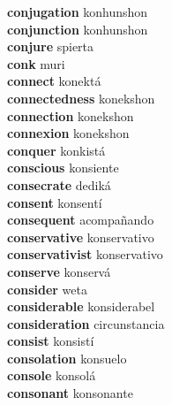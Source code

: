 \textbf{conjugation } konhunshon \\
\textbf{conjunction } konhunshon \\
\textbf{conjure } spierta \\
\textbf{conk } muri \\
\textbf{connect } konektá \\
\textbf{connectedness } konekshon \\
\textbf{connection } konekshon \\
\textbf{connexion } konekshon \\
\textbf{conquer } konkistá \\
\textbf{conscious } konsiente \\
\textbf{consecrate } dediká \\
\textbf{consent } konsentí \\
\textbf{consequent } acompañando \\
\textbf{conservative } konservativo \\
\textbf{conservativist } konservativo \\
\textbf{conserve } konservá \\
\textbf{consider } weta \\
\textbf{considerable } konsiderabel \\
\textbf{consideration } circunstancia \\
\textbf{consist } konsistí \\
\textbf{consolation } konsuelo \\
\textbf{console } konsolá \\
\textbf{consonant } konsonante \\
